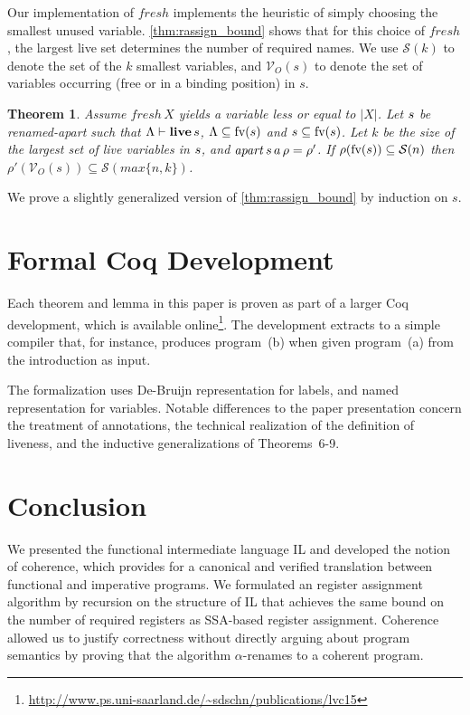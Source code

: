 \documentclass[openright,a4paper,11pt]{scrartcl}
\newcommand{\incl}{\ensuremath{\subseteq}}
\newcommand{\set}[1]{\ensuremath{\{#1\}}}
\newcommand{\fv}{\ensuremath{\textup{fv}}}
\newcommand{\freenam}[1]{\ensuremath{\fv(#1)}}
\newcommand{\LC}{\ensuremath{\Lambda}}
\newcommand{\livesA}[3]{\ensuremath{#1\vdash\textbf{\textup{live}}\,{}#3}}
\newcommand{\myref}[1]{\autoref{#1}}
\theoremstyle{plain}
\newtheorem{theorem}{Theorem}
\theoremstyle{plain}
\theoremstyle{plain}
\theoremstyle{plain}
\theoremstyle{nonumberplain}
\begin{document}
\newcommand{\occurvars}[1]{\ensuremath{\mathcal{V}_O(#1)}}
\newcommand{\segment}[1]{\ensuremath{\mathcal{S}(#1)}}

Our implementation of $\mathit{fresh}$ implements the heuristic of simply choosing the smallest unused variable.
\myref{thm:rassign_bound} shows that for this choice of $\mathit{fresh}$, the largest live set determines the number of required names.
We use $\segment{k}$ to denote the set of the $k$ smallest variables, and
$\occurvars{s}$ to denote the set of variables occurring (free or in a binding position) in $s$.
\begin{theorem}
Assume $\mathit{fresh}\,X$ yields a variable less or equal to $|X|$.
Let $s$ be renamed-apart such that $\livesA{\LC}{X}{\sterm}$, $\LC\incl\freenam{s}$ and $s\incl\freenam{s}$.
Let $k$ be the size of the largest set of live variables in $s$, and $\mathit{apart}\,s\,a\,\rho = \rho'$.
If $\rho (\freenam{s}) \incl \segment{n}$ then
$\rho' (\occurvars{s}) \incl \segment{\mathit{max}\set{n,k}}$.
\label{thm:rassign_bound}
\end{theorem}
We prove a slightly generalized version of \myref{thm:rassign_bound} by induction on $s$.





\section{Formal Coq Development}
\label{sec:formdev}
Each theorem and lemma in this paper is proven as part of a larger Coq development,
which is available online\footnote{\url{http://www.ps.uni-saarland.de/~sdschn/publications/lvc15}}.
The development extracts to a simple compiler that, for instance, produces program~(b) when given program~(a) from the introduction as input.

The formalization uses De-Bruijn representation for labels, and named representation for variables.
Notable differences to the paper presentation concern the treatment of annotations, the technical realization of the definition of liveness, and the inductive generalizations of Theorems~6-9.

 \section{Conclusion}
We presented the functional intermediate language IL and developed the notion of coherence, which
provides for a canonical and verified translation between functional and imperative programs.
We formulated an register assignment algorithm by recursion on the structure of IL that achieves the same bound on the number of required registers as SSA-based register assignment.
Coherence allowed us to justify correctness without directly arguing about program semantics by proving that the algorithm $\alpha$-renames to a coherent program.
\end{document}
